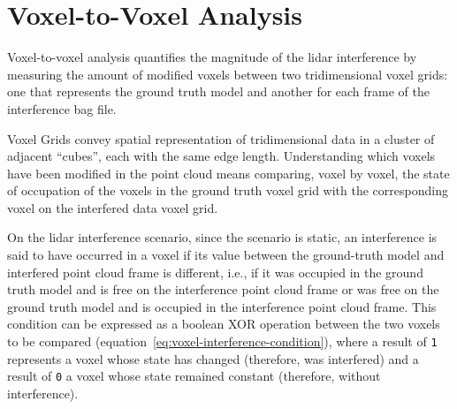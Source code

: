 



\section{Voxel-to-Voxel Analysis}
\label{sec:lidar-interference:voxel-analysis}
Voxel-to-voxel analysis quantifies the magnitude of the \ac{lidar} interference by measuring the amount of modified voxels between two tridimensional voxel grids: one that represents the ground truth model and another for each frame of the interference bag file.

Voxel Grids convey spatial representation of tridimensional data in a cluster of adjacent ``cubes'', each with the same edge length. Understanding which voxels have been modified in the point cloud means comparing, voxel by voxel, the state of occupation of the voxels in the ground truth voxel grid with the corresponding voxel on the interfered data voxel grid. 

On the \ac{lidar} interference scenario, since the scenario is static, an interference is said to have occurred in a voxel if its value between the ground-truth model and interfered point cloud frame is different, i.e., if it was occupied in the ground truth model and is free on the interference point cloud frame or was free on the ground truth model and is occupied in the interference point cloud frame. This condition can be expressed as a boolean XOR operation between the two voxels to be compared (equation~\ref{eq:voxel-interference-condition}), where a result of \texttt{1} represents a voxel whose state has changed (therefore, was interfered) and a result of \texttt{0} a voxel whose state remained constant (therefore, without interference).

